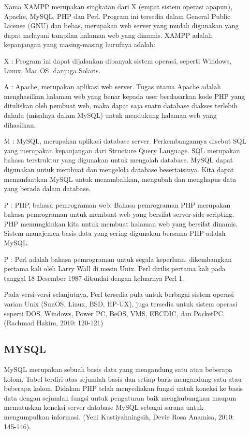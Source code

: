 \documentclass{jtetiproposalskripsi}
\begin{document}
Nama XAMPP merupakan singkatan dari X (empat sistem operasi apapun), Apache, MySQL, PHP dan Perl. Program ini tersedia dalam General Public License (GNU) dan bebas, merupakan web server yang mudah digunakan yang dapat melayani tampilan halaman web yang dinamis.  
XAMPP adalah kepanjangan yang masing-masing hurufnya adalah:

X   :	Program ini dapat dijalankan dibanyak sistem operasi, seperti Windows, Linux, Mac OS, danjuga Solaris.

A   :	Apache, merupakan aplikasi web server. Tugas utama Apache adalah menghasilkan halaman web yang benar kepada user berdasarkan kode PHP yang dituliskan oleh pembuat web, maka dapat saja suatu database diakses terlebih dahulu (misalnya dalam MySQL) untuk mendukung halaman web yang dihasilkan.

M   :	MySQL, merupakan aplikasi database server. Perkembangannya disebut SQL yang merupakan kepanjangan dari Structure Query Language. SQL merupakan bahasa terstruktur yang digunakan untuk mengolah database. 
MySQL dapat digunakan untuk membuat dan mengelola database besertaisinya. Kita dapat memanfaatkan MySQL untuk menambahkan, mengubah dan menghapus data yang berada dalam database.

P    :	PHP, bahasa pemrograman web. Bahasa pemrograman PHP merupakan bahasa pemrograman untuk membuat web yang bersifat server-side scripting. PHP memungkinkan kita untuk membuat halaman web yang bersifat dinamis. Sistem manajemen basis data yang sering digunakan bersama PHP adalah MySQL.

P    :	Perl adalah bahasa pemrograman untuk segala keperluan, dikembangkan pertama kali oleh Larry Wall di mesin Unix. Perl dirilis pertama kali pada tanggal 18 Desember 1987 ditandai dengan keluarnya Perl 1.

Pada versi-versi selanjutnya, Perl tersedia pula untuk berbagai sistem operasi varian Unix (SunOS, Linux, BSD, HP-UX), juga tersedia untuk sistem operasi seperti DOS, Windows, Power PC, BeOS, VMS, EBCDIC, dan PocketPC. (Rachmad Hakim, 2010: 120-121)

\subsection{MYSQL}
MySQL merupakan sebuah basis data yang mengandung satu atau beberapa kolom. Tabel terdiri atas sejumlah basis dan setiap baris mengandung satu atau beberapa kolom. Didalam PHP telah menyediakan fungsi untuk koneksi ke basis data dengan sejumlah fungsi untuk pengaturan baik menghubungkan maupun memutuskan koneksi server database MySQL sebagai sarana untuk mengumpulkan informasi. (Yeni Kustiyahningsih, Devie Rosa Anamisa, 2010: 145-146).
\end{document}
